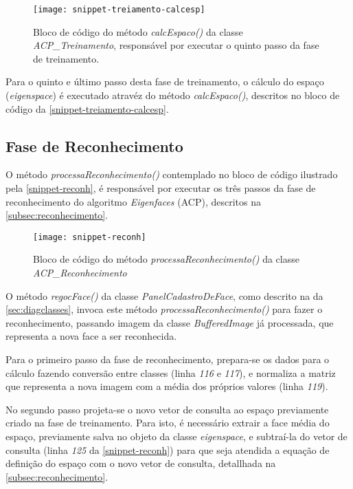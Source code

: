 \begin{figure}[h]
	\centering
	\texttt{[image: snippet-treiamento-calcesp]}
	\caption{Bloco de código do método \textit{calcEspaco()} da classe \textit{ACP\_Treinamento}, responsável por executar o quinto passo da fase de treinamento.}
	\label{snippet-treiamento-calcesp}
\end{figure}

Para o quinto e último passo desta fase de treinamento, o cálculo do espaço (\textit{eigenspace}) é executado atravéz do método \textit{calcEspaco()}, descritos no bloco de código da \autoref{snippet-treiamento-calcesp}. 





\subsection{Fase de Reconhecimento}\label{sec:implrecog}

O método \textit{processaReconhecimento()} contemplado no bloco de código ilustrado pela \autoref{snippet-reconh}, é responsável por executar os três passos da fase de reconhecimento do algoritmo \textit{Eigenfaces} (ACP), descritos na \autoref{subsec:reconhecimento}.

\begin{figure}[h]
	\centering
	\texttt{[image: snippet-reconh]}
	\caption{Bloco de código do método \textit{processaReconhecimento()} da classe \textit{ACP\_Reconhecimento}}
	\label{snippet-reconh}
\end{figure}


O método \textit{regocFace()} da classe \textit{PanelCadastroDeFace}, como descrito na da \autoref{sec:diagclasses}, invoca este método \textit{processaReconhecimento()} para fazer o reconhecimento, passando imagem da classe \textit{BufferedImage} já processada, que representa a nova face a ser reconhecida. 

Para o primeiro passo da fase de reconhecimento, prepara-se os dados para o cálculo fazendo conversão entre classes (linha \textit{116} e \textit{117}), e normaliza a matriz que representa a nova imagem com a média dos próprios valores (linha \textit{119}).

No segundo passo projeta-se o novo vetor de consulta ao espaço previamente criado na fase de treinamento. Para isto, é necessário extrair a face média do espaço, previamente salva no objeto da classe \textit{eigenspace}, e subtraí-la do vetor de consulta (linha \textit{125} da \autoref{snippet-reconh}) para que seja atendida a equação de definição do espaço com o novo vetor de consulta, detallhada  na \autoref{subsec:reconhecimento}. 

